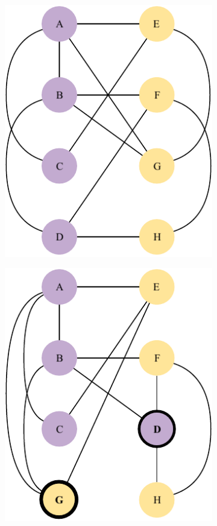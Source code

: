 \documentclass[a4paper, 10pt]{article}
\begin{document}
\begin{figure}[H]
    \centering
    \begin{subfigure}{0.19\textwidth}
        \centering
        \includegraphics[width=1\linewidth]{5_11.pdf}
    \end{subfigure}
    \hfill
    \begin{subfigure}{0.19\textwidth}
        \centering
        \includegraphics[width=1\linewidth]{5_12.pdf}

\end{subfigure}
\end{figure}
\end{document}
